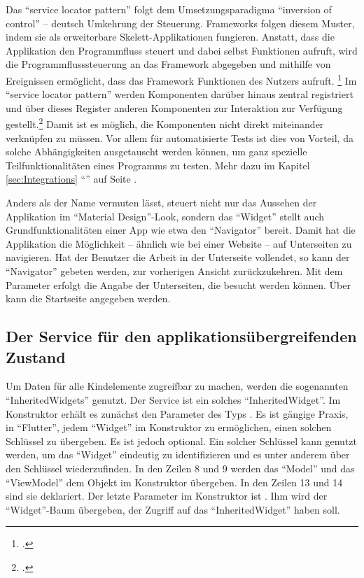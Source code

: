 Das \enquote{service locator pattern} folgt dem Umsetzungsparadigma \enquote{inversion of control} -- deutsch Umkehrung der Steuerung.
Frameworks folgen diesem Muster, indem sie als erweiterbare Skelett-Applikationen fungieren.
Anstatt, dass die Applikation den Programmfluss steuert und dabei selbst Funktionen aufruft, wird die Programmflusssteuerung an das Framework abgegeben und mithilfe von Ereignissen ermöglicht, dass das Framework Funktionen des Nutzers aufruft.
\footcite[Vgl.][]{johnson1988designing}
Im \enquote{service locator pattern} werden Komponenten darüber hinaus zentral registriert und über dieses Register anderen Komponenten zur Interaktion zur Verfügung gestellt.\footcite[Vgl.][]{fowler2004DependencyInjection}
Damit ist es möglich, die Komponenten nicht direkt miteinander verknüpfen zu müssen.
Vor allem für automatisierte Tests ist dies von Vorteil, da solche Abhängigkeiten ausgetauscht werden können, um ganz spezielle Teilfunktionalitäten eines Programms zu testen.
 Mehr dazu im Kapitel \ref{sec:Integrations} \enquote{} auf Seite \pageref{sec:Integrations}.


Anders als der Name vermuten lässt, steuert   nicht nur das Aussehen der Applikation im \enquote{Material Design}-Look,
sondern das \enquote{Widget} stellt auch Grundfunktionalitäten einer App wie etwa den \enquote{Navigator} bereit.
Damit hat die Applikation die Möglichkeit -- ähnlich wie bei einer Website -- auf Unterseiten zu navigieren.
Hat der Benutzer die Arbeit in der Unterseite vollendet, so kann der \enquote{Navigator} gebeten werden, zur vorherigen Ansicht zurückzukehren.
 Mit dem Parameter   erfolgt die Angabe der Unterseiten, die besucht werden können.
Über   kann die Startseite angegeben werden.


\subsection{Der Service für den applikationsübergreifenden Zustand}
\label{sec:ServiceFuerDenApplikationsuebergreifendenZustand}

Um Daten für alle Kindelemente zugreifbar zu machen, werden die sogenannten \enquote{InheritedWidgets} genutzt.
Der Service  \Lst{\ref{lst:Schritt1DerServiceAppState}} ist ein solches \enquote{InheritedWidget}.
Im Konstruktor erhält es zunächst den Parameter des Typs  .
Es ist gängige Praxis, in \enquote{Flutter}, jedem \enquote{Widget} im Konstruktor zu ermöglichen, einen solchen Schlüssel zu übergeben.
Es ist jedoch optional.
 Ein solcher Schlüssel kann genutzt werden, um das \enquote{Widget} eindeutig zu identifizieren und es unter anderem über den Schlüssel wiederzufinden.
In den Zeilen 8 und 9 werden das \enquote{Model} und das \enquote{ViewModel} dem Objekt im Konstruktor übergeben.
In den Zeilen 13 und 14 sind sie deklariert.
Der letzte Parameter im Konstruktor ist  .
Ihm wird der \enquote{Widget}-Baum übergeben, der Zugriff auf das \enquote{InheritedWidget} haben soll.

